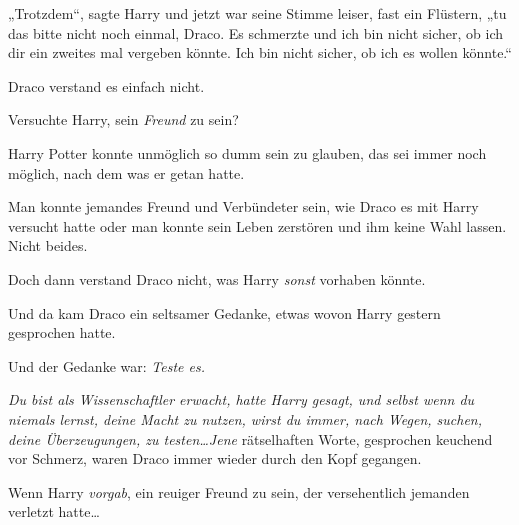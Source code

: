 „Trotzdem“, sagte Harry und jetzt war seine Stimme leiser, fast ein Flüstern, „tu das bitte nicht noch einmal, Draco. Es schmerzte und ich bin nicht sicher, ob ich dir ein zweites mal vergeben könnte. Ich bin nicht sicher, ob ich es wollen könnte.“

Draco verstand es einfach nicht.

Versuchte Harry, sein \emph{Freund} zu sein?

Harry Potter konnte unmöglich so dumm sein zu glauben, das sei immer noch möglich, nach dem was er getan hatte.

Man konnte jemandes Freund und Verbündeter sein, wie Draco es mit Harry versucht hatte oder man konnte sein Leben zerstören und ihm keine Wahl lassen. Nicht beides.

Doch dann verstand Draco nicht, was Harry \emph{sonst} vorhaben könnte.

Und da kam Draco ein seltsamer Gedanke, etwas wovon Harry gestern gesprochen hatte.

Und der Gedanke war: \emph{Teste es.}

\emph{Du bist als Wissenschaftler erwacht, hatte Harry gesagt, und selbst wenn du niemals lernst, deine Macht zu nutzen, wirst du immer, nach Wegen, suchen, deine Überzeugungen, zu testen…Jene} rätselhaften Worte, gesprochen keuchend vor Schmerz, waren Draco immer wieder durch den Kopf gegangen.

Wenn Harry \emph{vorgab}, ein reuiger Freund zu sein, der versehentlich jemanden verletzt hatte…

